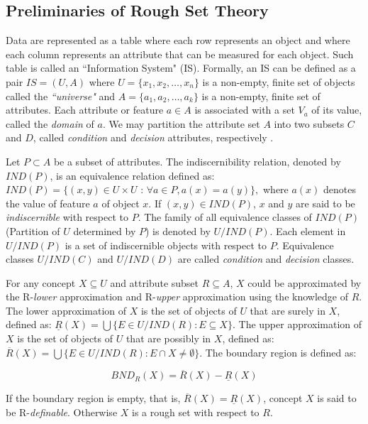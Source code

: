 \documentclass{llncs}
\begin{document}
\subsection{Preliminaries of Rough Set Theory}

Data are represented as a table where each row represents an object and where each column represents an attribute
that can be measured for each object. Such table is called an ``Information System" (IS). Formally, an IS can be defined as a pair $IS = (U, A)$ where $U = \{x_1, x_2, \ldots, x_n\}$  is a non-empty, finite set of objects called the \emph{``universe"} and $A = \{a_1, a_2, \ldots, a_k\}$ is a non-empty, finite set of attributes. Each attribute or feature $a \in A $ is associated with a set $V_a$ of its value, called the \emph{domain} of $a$. We may partition the attribute set $A$ into two subsets $C$ and $D$, called   \emph{condition} and \emph{decision} attributes, respectively \cite{pawlak2008rough}.


Let $P \subset A$ be a subset of attributes. The indiscernibility relation, denoted by $IND(P)$, is an equivalence relation defined as: $IND(P) =  \{(x, y) \in U \times U \mbox{ : } \forall a \in P, a(x) = a(y)\},$ where $a(x)$ denotes the value of feature $a$ of object $x$. If $(x, y) \in IND(P)$, $x$ and $y$ are said to be \emph{indiscernible} with respect to $P$. The family of all equivalence classes of $IND(P)$ (Partition of $U$ determined by $P$) is denoted by $U/IND(P)$. Each element
in $U/IND(P)$ is a set of indiscernible objects with respect to $P$. Equivalence classes $U/IND(C)$ and $U/IND(D)$
are called \emph{condition} and \emph{decision} classes.


For any concept $X \subseteq U$ and attribute subset $R \subseteq A$, $X$ could be approximated by the R-\emph{lower} approximation and R-\emph{upper} approximation using the knowledge of $R$. The lower approximation of $X$ is the set of objects of $U$ that are surely in $X$, defined as: $ \underline{R}(X) = \bigcup \{E \in U/IND(R)  : E \subseteq X \}.$ The upper approximation of $X$ is the set of objects of $U$ that are possibly in $X$, defined as: $\overline{R}(X) = \bigcup \{E \in U/IND(R)  : E \cap X \ne \emptyset \}$. The boundary region is defined as:

\begin{displaymath}
BND_R(X) = \overline{R}(X) - \underline{R}(X)
\end{displaymath}

If the boundary region is empty, that is, $\overline{R}(X) = \underline{R}(X)$, concept $X$ is said to be R-\emph{definable}. Otherwise $X$ is a rough set with respect to $R$.
\end{document}
